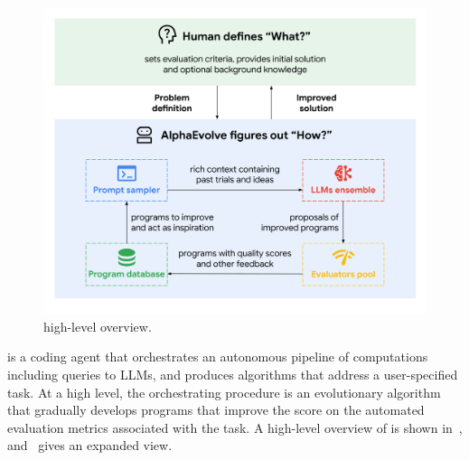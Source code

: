 \section{\method}
\label{sec:method}

\begin{figure}
\vspace{-4.5em}
\includegraphics[width=0.99\linewidth, trim=2cm 2cm 2cm 2cm]{figures/method_high_level.pdf}
\caption{\method high-level overview.}
\label{fig:high-level}
\end{figure}

\method is a coding agent that orchestrates an autonomous pipeline of computations including queries to LLMs, and produces algorithms that address a user-specified task.
At a high level, the orchestrating procedure is an evolutionary algorithm that gradually develops programs that improve the score on the automated evaluation metrics associated with the task.
A high-level overview of \method is shown in~, and~ gives an expanded view.

